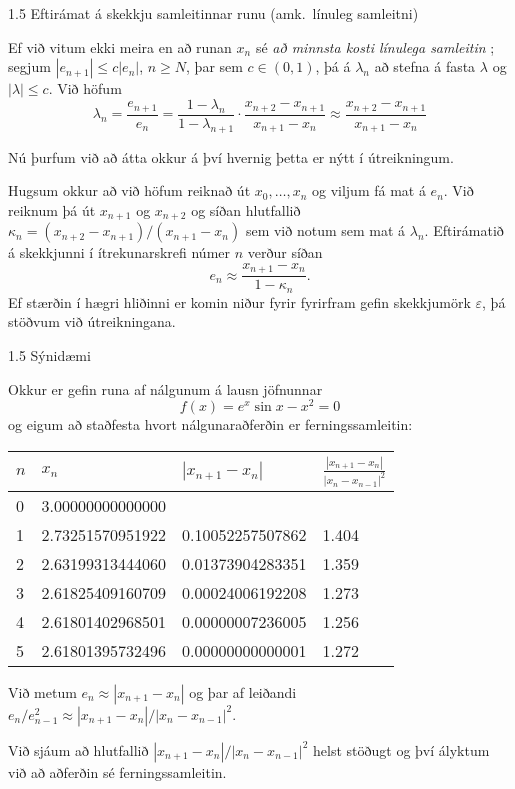 %
\begin{frame}{1.5 Eftirámat á skekkju samleitinnar runu (amk.~línuleg samleitni)} 


Ef við vitum ekki meira en að runan $x_n$ sé {\it að minnsta kosti
  línulega samleitin} ; segjum $|e_{n+1}|\leq c|e_n|$, $n\geq N$, 
þar sem $c\in(0,1)$, þá á $\lambda_n$ að stefna á fasta $\lambda$ 
og $|\lambda|\leq c$. Við höfum
\begin{equation*}
    \lambda_n = \dfrac{e_{n+1}}{e_n} = 
    \dfrac{1-\lambda_n}{1-\lambda_{n+1}}
    \cdot\dfrac{x_{n+2}-x_{n+1}}{x_{n+1}-x_n}\approx 
    \dfrac{x_{n+2}-x_{n+1}}{x_{n+1}-x_n}
\end{equation*}

\pause
Nú þurfum við að átta okkur á því hvernig þetta er nýtt í
útreikningum. 

\pause
\smallskip
Hugsum okkur að við höfum reiknað út
$x_0,\dots,x_n$ og viljum fá mat á $e_n$. \pause Við reiknum þá  út $x_{n+1}$
og  $x_{n+2}$ og síðan hlutfallið $\kappa_n=(x_{n+2} - x_{n+1})/(x_{n+1} -
x_n)$ sem við notum sem mat á $\lambda_n$.  \pause Eftirámatið á skekkjunni í
ítrekunarskrefi númer $n$ verður síðan 
\begin{equation*}
    e_n\approx \dfrac{x_{n+1}-x_n}{1-\kappa_n}.
\end{equation*}
\pause
\smallskip
Ef stærðin í hægri hliðinni er komin niður fyrir fyrirfram 
gefin skekkjumörk $\varepsilon$, þá stöðvum við útreikningana.
\end{frame}
%
%
\begin{frame}{1.5 Sýnidæmi} 

Okkur er gefin runa af nálgunum á lausn jöfnunnar
\begin{equation*}
    f(x) = e^x\sin x-x^2 = 0
\end{equation*}
og eigum að staðfesta hvort nálgunaraðferðin er ferningssamleitin:

\pause
\begin{center}
\begin{tabular}{l|l|l|l|}
$n$  & $x_n$ &$|x_{n+1}-x_n|$ &  $\frac{|x_{n+1}-x_n|}{|x_n-x_{n-1}|^2}$\\ \hline 
   0&   3.00000000000000 & & \\
   1&   2.73251570951922 &  0.10052257507862 &  1.404\\
   2&   2.63199313444060 &  0.01373904283351 &  1.359\\
   3&  2.61825409160709  & 0.00024006192208  & 1.273\\
   4&   2.61801402968501 &  0.00000007236005 &  1.256\\
   5&   2.61801395732496 &  0.00000000000001 &  1.272\\
\end{tabular}   
\end{center}

\pause
\smallskip
Við metum $e_n\approx |x_{n+1}-x_n|$ og þar af leiðandi 
$e_n/e_{n-1}^2\approx |x_{n+1}-x_n|/|x_n-x_{n-1}|^2$.

\pause
Við sjáum að hlutfallið $|x_{n+1}-x_n|/|x_n-x_{n-1}|^2$ helst
stöðugt og því ályktum við að aðferðin sé ferningssamleitin.
\end{frame}
%



